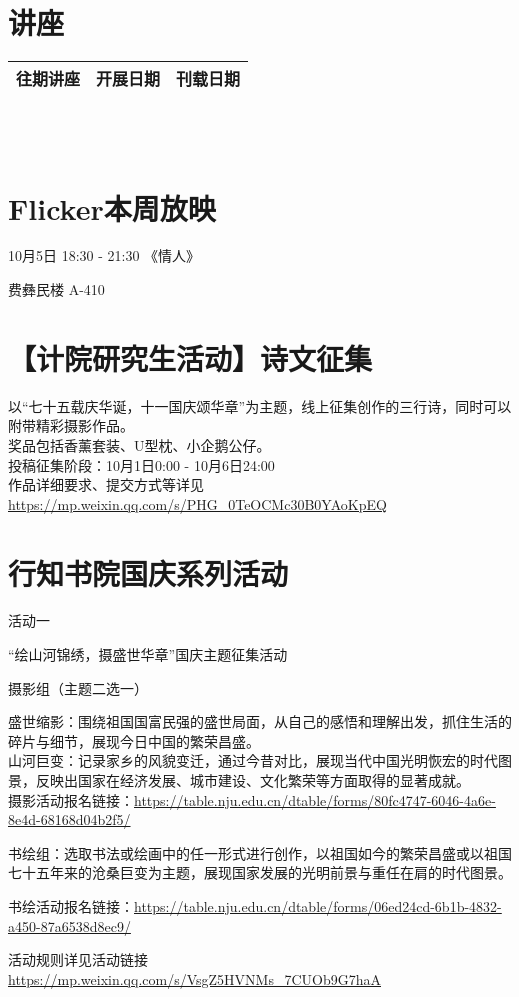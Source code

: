 \documentclass[letterpaper, 12pt]{article}
\begin{document}
\begin{multicols}{2}
\section{讲座}
\begin{tabular}{|c|c|c|}
    \hline
    往期讲座 & 开展日期 & 刊载日期\\
    \hline\hline
      \hline
\end{tabular}\\\\
\section{Flicker本周放映}
10月5日 18:30 - 21:30 《情人》

费彝民楼 A-410
\section{【计院研究生活动】诗文征集}
以“七十五载庆华诞，十一国庆颂华章”为主题，线上征集创作的三行诗，同时可以附带精彩摄影作品。\\
奖品包括香薰套装、U型枕、小企鹅公仔。\\
投稿征集阶段：10月1日0:00 - 10月6日24:00\\
作品详细要求、提交方式等详见\url{https://mp.weixin.qq.com/s/PHG_0TeOCMc30B0YAoKpEQ}

\section{行知书院国庆系列活动}
活动一

“绘山河锦绣，摄盛世华章”国庆主题征集活动

摄影组（主题二选一）

盛世缩影：围绕祖国国富民强的盛世局面，从自己的感悟和理解出发，抓住生活的碎片与细节，展现今日中国的繁荣昌盛。\\山河巨变：记录家乡的风貌变迁，通过今昔对比，展现当代中国光明恢宏的时代图景，反映出国家在经济发展、城市建设、文化繁荣等方面取得的显著成就。\\
摄影活动报名链接：\url{https://table.nju.edu.cn/dtable/forms/80fc4747-6046-4a6e-8e4d-68168d04b2f5/}

书绘组：选取书法或绘画中的任一形式进行创作，以祖国如今的繁荣昌盛或以祖国七十五年来的沧桑巨变为主题，展现国家发展的光明前景与重任在肩的时代图景。

书绘活动报名链接：\url{https://table.nju.edu.cn/dtable/forms/06ed24cd-6b1b-4832-a450-87a6538d8ec9/}

活动规则详见活动链接\url{https://mp.weixin.qq.com/s/VsgZ5HVNMs_7CUOb9G7haA}\\


\end{multicols}
\end{document}
